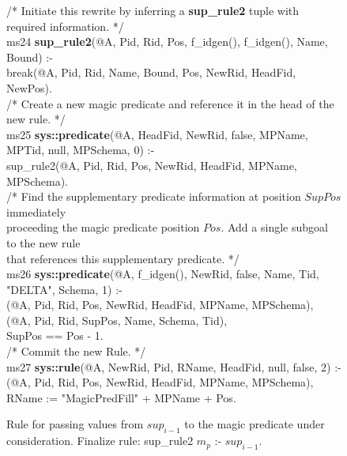 \begin{figure}[!t]
\ssp
\centering
\begin{boxedminipage}{\linewidth}
/* Initiate this rewrite by inferring a {\bf sup\_rule2} tuple with required information. */ \\
ms24 {\bf sup\_rule2}(@A, Pid, Rid, Pos, f\_idgen(), f\_idgen(), Name, Bound) :- \\
\datalogspace break(@A, Pid, Rid, Name, Bound, Pos, NewRid, HeadFid, NewPos). \\
	
/* Create a new magic predicate and reference it in the head of the new rule. */ \\
ms25 {\bf sys::predicate}(@A, HeadFid, NewRid, false, MPName, MPTid, null, MPSchema, 0) :- \\
\datalogspace sup\_rule2(@A, Pid, Rid, Pos, NewRid, HeadFid, MPName, MPSchema). \\
	
/* Find the supplementary predicate information at position $SupPos$ immediately \\
proceeding the magic predicate position $Pos$. Add a single subgoal to the new rule \\
that references this supplementary predicate. */ \\
ms26 {\bf sys::predicate}(@A, f\_idgen(), NewRid, false, Name, Tid, "DELTA", Schema, 1) :- \\
(@A, Pid, Rid, Pos, NewRid, HeadFid, MPName, MPSchema), \\
(@A, Pid, Rid, SupPos, Name, Schema, Tid), \\
\datalogspace SupPos == Pos - 1. \\
	
/* Commit the new Rule. */ \\
ms27 {\bf sys::rule}(@A, NewRid, Pid, RName, HeadFid, null, false, 2) :- \\
(@A, Pid, Rid, Pos, NewRid, HeadFid, MPName, MPSchema), \\
\datalogspace RName := "MagicPredFill" + MPName + Pos. \\

\end{boxedminipage}
\caption{\label{ch:magic:fig:rewrite6} Rule for passing values from $sup_{i-1}$ to the 
magic predicate under consideration. Finalize rule: sup\_rule2 $m_p$ :- $sup_{i-1}$.}
\end{figure}

